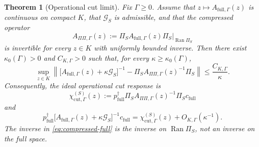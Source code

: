 \documentclass[11pt]{article}
\theoremstyle{definition}
\theoremstyle{remark}
\theoremstyle{plain}
\newtheorem{theoremzeroa}{Theorem}
\newcommand{\Ran}{\operatorname{Ran}}
\newcommand{\full}{\mathrm{full}}
\newcommand{\cut}{\mathrm{cut}}
\newcommand{\Gcut}{\mathcal G}
\begin{document}
\begin{theoremzeroa}[Operational cut limit]\label{thm:operational-cut}
Fix $\Gamma\ge0$.  Assume that $z\mapsto A_{\full,\Gamma}(z)$ is continuous on compact $K$, that $\Gcut_S$ is admissible, and that the compressed operator
\begin{equation}\label{eq:compressed-full}
  A_{\Pi\Pi,\Gamma}(z)
  :=\Pi_S A_{\full,\Gamma}(z)\Pi_S\big|_{\Ran\Pi_S}
\end{equation}
is invertible for every $z\in K$ with uniformly bounded inverse.  Then there exist $\kappa_0(\Gamma)>0$ and $C_{K,\Gamma}>0$ such that, for every $\kappa\ge\kappa_0(\Gamma)$,
\begin{equation}\label{eq:operational-limit-operator}
  \sup_{z\in K}
  \left\|
  \bigl[A_{\full,\Gamma}(z)+\kappa\Gcut_S\bigr]^{-1}
  -\Pi_S A_{\Pi\Pi,\Gamma}(z)^{-1}\Pi_S
  \right\|
  \le \frac{C_{K,\Gamma}}{\kappa}.
\end{equation}
Consequently, the ideal operational cut response is
\begin{equation}\label{eq:ideal-cut-response}
  \boxed{
  \chi_{\cut,\Gamma}^{(S)}(z)
  :=p_{\full}^{\dagger}\Pi_S
  A_{\Pi\Pi,\Gamma}(z)^{-1}
  \Pi_Sc_{\full}}
\end{equation}
and
\begin{equation}\label{eq:finite-kappa-response}
  p_{\full}^{\dagger}
  \bigl[A_{\full,\Gamma}(z)+\kappa\Gcut_S\bigr]^{-1}c_{\full}
  =\chi_{\cut,\Gamma}^{(S)}(z)+O_{K,\Gamma}(\kappa^{-1}).
\end{equation}
The inverse in \eqref{eq:compressed-full} is the inverse on $\Ran\Pi_S$, not an inverse on the full space.
\end{theoremzeroa}
\end{document}
